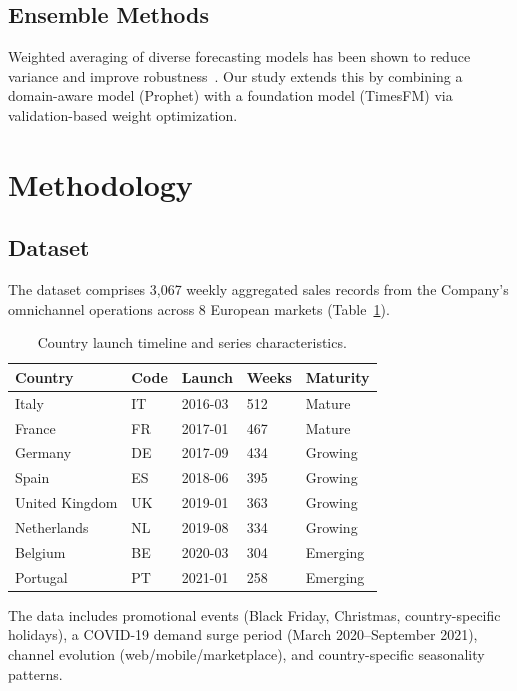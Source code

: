\documentclass[10pt,twocolumn,a4paper]{article}
\begin{document}
\subsection{Ensemble Methods}
Weighted averaging of diverse forecasting models has been shown to reduce variance and improve robustness~\cite{makridakis2020m5}. Our study extends this by combining a domain-aware model (Prophet) with a foundation model (TimesFM) via validation-based weight optimization.

\section{Methodology}
\label{sec:methodology}

\subsection{Dataset}

The dataset comprises 3,067 weekly aggregated sales records from the Company's omnichannel operations across 8 European markets (Table~\ref{tab:countries}).

\begin{table}[t]
\caption{Country launch timeline and series characteristics.}
\label{tab:countries}
\setlength{\tabcolsep}{24pt}
\renewcommand{\arraystretch}{1.4}
\begin{tabular}{l l l l l}
\toprule
\textbf{Country} & \textbf{Code} & \textbf{Launch} & \textbf{Weeks} & \textbf{Maturity} \\
\midrule
Italy & IT & 2016-03 & 512 & Mature \\
France & FR & 2017-01 & 467 & Mature \\
Germany & DE & 2017-09 & 434 & Growing \\
Spain & ES & 2018-06 & 395 & Growing \\
United Kingdom & UK & 2019-01 & 363 & Growing \\
Netherlands & NL & 2019-08 & 334 & Growing \\
Belgium & BE & 2020-03 & 304 & Emerging \\
Portugal & PT & 2021-01 & 258 & Emerging \\
\bottomrule
\end{tabular}
\end{table}

The data includes promotional events (Black Friday, Christmas, country-specific holidays), a COVID-19 demand surge period (March 2020--September 2021), channel evolution (web/mobile/marketplace), and country-specific seasonality patterns.
\end{document}
